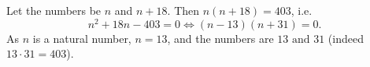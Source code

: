 Let the numbers be $n$ and $n+18$. Then $n(n+18)=403$, i.e.
\[
n^2+18n-403=0\iff(n-13)(n+31)=0 .
\]
As $n$ is a natural number, $n=13$, and the numbers are $\boxed{13\text{ and }31}$ (indeed $13\cdot31=403$).
